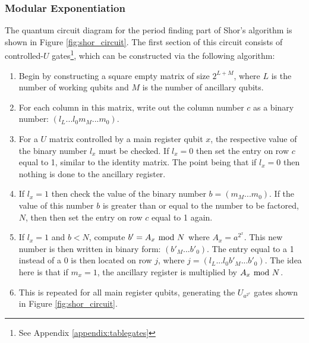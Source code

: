 \documentclass{article}[11pt]
\begin{document}
\subsubsection{Modular Exponentiation}
The quantum circuit diagram for the period finding part of Shor's algorithm is shown in Figure \ref{fig:shor_circuit}. The first section of this circuit consists of controlled-$U$ gates\footnote{See Appendix \ref{appendix:tablegates}}, which can be constructed via the following algorithm:\cite{candela}
\begin{enumerate}
    \item Begin by constructing a square empty matrix of size $2^{L+M}$, where $L$ is the number of working qubits and $M$ is the number of ancillary qubits.
    \item For each column in this matrix, write out the column number $c$ as a binary number: $(l_{L}...l_{0}m_{M}...m_{0})$.
    \item For a $U$ matrix controlled by a main register qubit $x$, the respective value of the binary number $l_x$ must be checked. If $l_x=0$ then set the entry on row $c$ equal to 1, similar to the identity matrix. The point being that if $l_x=0$ then nothing is done to the ancillary register.
    \item If $l_x=1$ then check the value of the binary number $b=(m_{M}...m_{0})$. If the value of this number $b$ is greater than or equal to the number to be factored, $N$, then then set the entry on row $c$ equal to 1 again.
    \item If $l_x=1$ and $b<N$, compute $b' = A_x\hspace{-0.1cm}\mod N$ where $A_x = a^{2^x}$. This new number is then written in binary form: $(b'_{M}...b'_{0})$. The entry equal to a 1 instead of a 0 is then located on row $j$, where $j=(l_{L}...l_{0}b'_{M}...b'_{0})$. The idea here is that if $m_x=1$, the ancillary register is multiplied by $A_x\hspace{-0.1cm}\mod N$.
    \item This is repeated for all main register qubits, generating the $U_{a^{2^x}}$ gates shown in Figure \ref{fig:shor_circuit}.
\end{enumerate}
\end{document}
